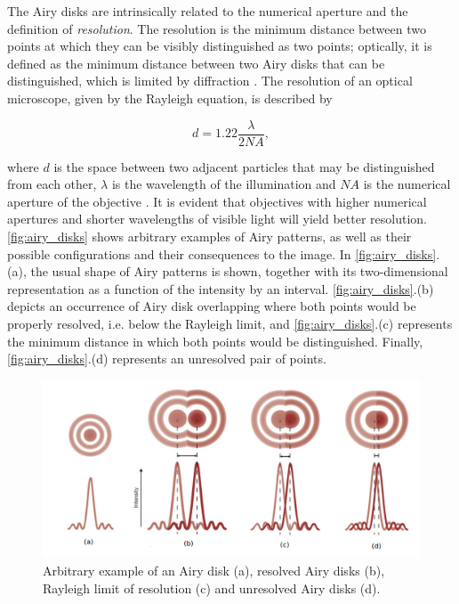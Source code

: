The Airy disks are intrinsically related to the numerical aperture and the definition of \emph{resolution}. The resolution is the minimum distance between two points at which they can be visibly distinguished as two points; optically, it is defined as the minimum distance between two Airy disks that can be distinguished, which is limited by diffraction \cite{leng2009materials}. The resolution of an optical microscope, given by the Rayleigh equation, is described by

\begin{equation}
\label{eqn:resolution}
d = 1.22 \frac{\lambda}{2 NA},
\end{equation}

\noindent where $d$ is the space between two adjacent particles that may be distinguished from each other, $\lambda$ is the wavelength of the illumination and $NA$ is the numerical aperture of the objective \cite{davidson2002optical}. It is evident that objectives with higher numerical apertures and shorter wavelengths of visible light will yield better resolution. \autoref{fig:airy_disks} shows arbitrary examples of Airy patterns, as well as their possible configurations and their consequences to the image. In \autoref{fig:airy_disks}.(a), the usual shape of Airy patterns is shown, together with its two-dimensional representation as a function of the intensity by an interval. \autoref{fig:airy_disks}.(b) depicts an occurrence of Airy disk overlapping where both points would be properly resolved, i.e. below the Rayleigh limit, and \autoref{fig:airy_disks}.(c) represents the minimum distance in which both points would be distinguished. Finally, \autoref{fig:airy_disks}.(d) represents an unresolved pair of points.

\begin{figure}[htb]
	\centering
	\caption{\label{fig:airy_disks} Arbitrary example of an Airy disk (a), resolved Airy disks (b), Rayleigh limit of resolution (c) and unresolved Airy disks (d).} 
	\begin{center}
	    \includegraphics[scale=0.4]{images/airy_disks.png}
	\end{center}
	\centering
\end{figure}


